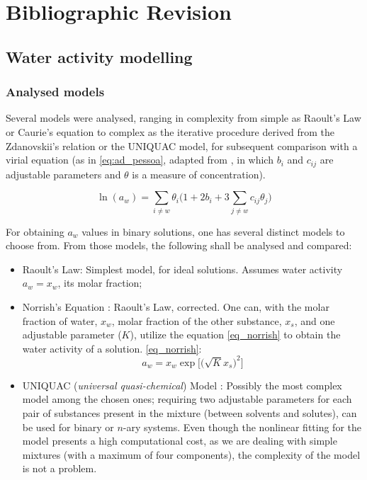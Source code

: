 \part{Bibliographic Revision}

\chapter{Water activity modelling}

\section{Analysed models}

Several models were analysed, ranging in complexity from simple as Raoult's Law
or Caurie's equation to complex as the iterative procedure derived from the
Zdanovskii's relation or the UNIQUAC model, for subsequent comparison with a
virial equation (as in \ref{eq:ad_pessoa}, adapted from \cite{pessoa2008}, in
which $b_i$ and $c_{ij}$ are adjustable parameters and $\theta$ is a measure
of concentration).

\begin{equation}
	\label{eq:ad_pessoa}
	\ln(a_w) = \sum_{i \neq w}\theta_i\Bigg(1 +%
	2b_i+3\sum_{j \neq w}c_{ij}\theta_j\Bigg)
\end{equation}

For obtaining $a_w$ values in binary solutions, one has several distinct models
to choose from. From those models, the following shall be analysed and compared:

\begin{itemize}
	\item Raoult's Law: Simplest model, for ideal solutions. Assumes
		water activity $a_w = x_w$, its molar fraction;
	\item Norrish's Equation \cite{norrish1966}: Raoult's Law, corrected.
		One can, with the molar fraction of water, $x_w$, molar
		fraction of the other substance, $x_s$, and one adjustable
		parameter ($K$), utilize the equation \ref{eq_norrish} to
		obtain the water activity of a solution.
		\ref{eq_norrish}:
		\begin{equation}
			\label{eq_norrish}
			a_w = x_w\exp\Big[\Big(\sqrt{K}x_s\Big)^2\Big]
		\end{equation}
	\item UNIQUAC (\textit{universal quasi-chemical}) Model
		\cite{abrams1975}: Possibly the most complex model among the
		chosen ones; requiring two adjustable parameters for each pair
		of substances present in the mixture (between solvents and
		solutes), can be used for binary or $n$-ary systems. Even though
		the nonlinear fitting for the model presents a high computational
		cost, as we are dealing with simple mixtures (with a maximum of
		four components), the complexity of the model is not a problem.
\end{itemize}

